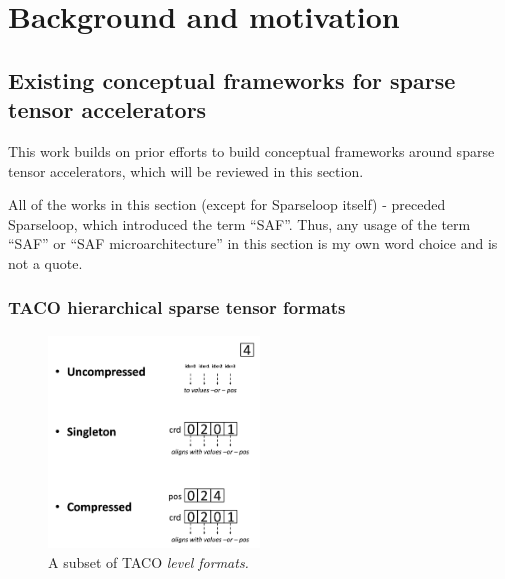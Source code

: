 \chapter{Background and motivation}
\label{chapter:background}

\section{Existing conceptual frameworks for sparse tensor accelerators}

This work builds on prior efforts to build conceptual frameworks around sparse tensor accelerators, which will be reviewed in this section.

All of the works in this section (except for Sparseloop\cite{sparseloop} itself) -  preceded Sparseloop, which introduced the term ``SAF''. Thus, any usage of the term ``SAF'' or ``SAF microarchitecture'' in this section is my own word choice and is not a quote.

\subsection{TACO\cite{taco_format} hierarchical sparse tensor formats}

\begin{figure}[H]
\includegraphics[width=0.5\textwidth]{figures/taco_levels.png}
\caption{A subset of TACO\cite{taco_format} \textit{level formats.}}
\label{fig:taco_levels}
\end{figure}

